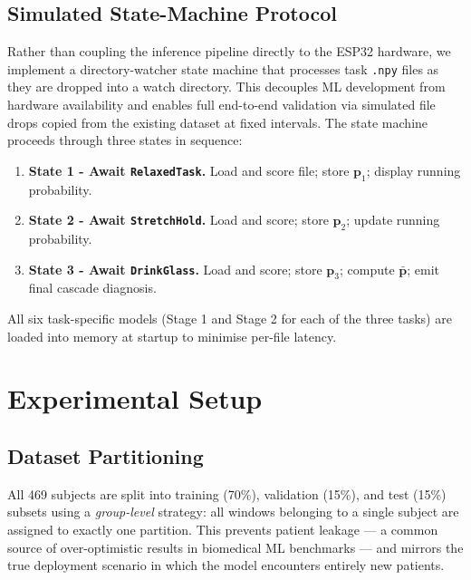 \documentclass[12pt, a4paper]{article}
\begin{document}
\subsection{Simulated State-Machine Protocol}

Rather than coupling the inference pipeline directly to the ESP32
hardware, we implement a directory-watcher state machine that processes
task \texttt{.npy} files as they are dropped into a watch directory.
This decouples ML development from hardware availability and enables
full end-to-end validation via simulated file drops copied from the
existing dataset at fixed intervals. The state machine proceeds through
three states in sequence:

\begin{enumerate}
  \item \textbf{State 1 - Await \texttt{RelaxedTask}.} Load and score
    file; store $\mathbf{p}_1$; display running probability.
  \item \textbf{State 2 - Await \texttt{StretchHold}.} Load and score;
    store $\mathbf{p}_2$; update running probability.
  \item \textbf{State 3 - Await \texttt{DrinkGlass}.} Load and score;
    store $\mathbf{p}_3$; compute $\bar{\mathbf{p}}$; emit final
    cascade diagnosis.
\end{enumerate}

\noindent
All six task-specific models (Stage 1 and Stage 2 for each of the
three tasks) are loaded into memory at startup to minimise per-file
latency.

\section{Experimental Setup}
\label{sec:setup}

\subsection{Dataset Partitioning}

All 469 subjects are split into training (70\%), validation (15\%),
and test (15\%) subsets using a \emph{group-level} strategy: all
windows belonging to a single subject are assigned to exactly one
partition. This prevents patient leakage — a common source of
over-optimistic results in biomedical ML benchmarks — and mirrors
the true deployment scenario in which the model encounters entirely
new patients.
\end{document}
